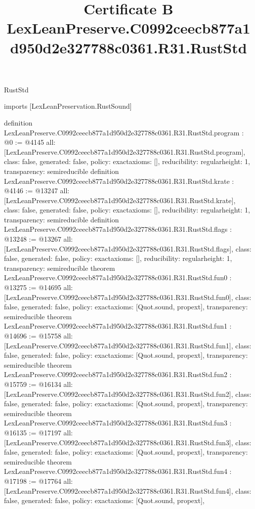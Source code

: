 \begin{lexlean}{RustStd}
\title{Certificate B LexLeanPreserve.C0992ceecb877a1d950d2e327788c0361.R31.RustStd}
\begin{coremodule}
imports [LexLeanPreservation.RustSound]

definition LexLeanPreserve.C0992ceecb877a1d950d2e327788c0361.R31.RustStd.program : @0 := @4145 {
  all: [LexLeanPreserve.C0992ceecb877a1d950d2e327788c0361.R31.RustStd.program],
  class: false,
  generated: false,
  policy: exact{axioms: []},
  reducibility: regular{height: 1},
  transparency: semireducible
}
definition LexLeanPreserve.C0992ceecb877a1d950d2e327788c0361.R31.RustStd.krate : @4146 := @13247 {
  all: [LexLeanPreserve.C0992ceecb877a1d950d2e327788c0361.R31.RustStd.krate],
  class: false,
  generated: false,
  policy: exact{axioms: []},
  reducibility: regular{height: 1},
  transparency: semireducible
}
definition LexLeanPreserve.C0992ceecb877a1d950d2e327788c0361.R31.RustStd.flags : @13248 := @13267 {
  all: [LexLeanPreserve.C0992ceecb877a1d950d2e327788c0361.R31.RustStd.flags],
  class: false,
  generated: false,
  policy: exact{axioms: []},
  reducibility: regular{height: 1},
  transparency: semireducible
}
theorem LexLeanPreserve.C0992ceecb877a1d950d2e327788c0361.R31.RustStd.fun0 : @13275 := @14695 {
  all: [LexLeanPreserve.C0992ceecb877a1d950d2e327788c0361.R31.RustStd.fun0],
  class: false,
  generated: false,
  policy: exact{axioms: [Quot.sound, propext]},
  transparency: semireducible
}
theorem LexLeanPreserve.C0992ceecb877a1d950d2e327788c0361.R31.RustStd.fun1 : @14696 := @15758 {
  all: [LexLeanPreserve.C0992ceecb877a1d950d2e327788c0361.R31.RustStd.fun1],
  class: false,
  generated: false,
  policy: exact{axioms: [Quot.sound, propext]},
  transparency: semireducible
}
theorem LexLeanPreserve.C0992ceecb877a1d950d2e327788c0361.R31.RustStd.fun2 : @15759 := @16134 {
  all: [LexLeanPreserve.C0992ceecb877a1d950d2e327788c0361.R31.RustStd.fun2],
  class: false,
  generated: false,
  policy: exact{axioms: [Quot.sound, propext]},
  transparency: semireducible
}
theorem LexLeanPreserve.C0992ceecb877a1d950d2e327788c0361.R31.RustStd.fun3 : @16135 := @17197 {
  all: [LexLeanPreserve.C0992ceecb877a1d950d2e327788c0361.R31.RustStd.fun3],
  class: false,
  generated: false,
  policy: exact{axioms: [Quot.sound, propext]},
  transparency: semireducible
}
theorem LexLeanPreserve.C0992ceecb877a1d950d2e327788c0361.R31.RustStd.fun4 : @17198 := @17764 {
  all: [LexLeanPreserve.C0992ceecb877a1d950d2e327788c0361.R31.RustStd.fun4],
  class: false,
  generated: false,
  policy: exact{axioms: [Quot.sound, propext]},
}
\end{coremodule}
\end{lexlean}
